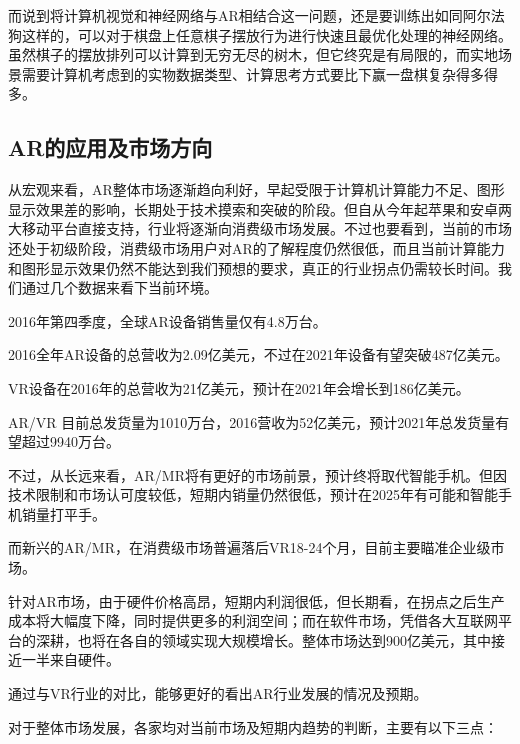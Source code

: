 \documentclass{article}
\begin{document}
而说到将计算机视觉和神经网络与AR相结合这一问题，还是要训练出如同阿尔法狗这样的，可以对于棋盘上任意棋子摆放行为进行快速且最优化处理的神经网络。虽然棋子的摆放排列可以计算到无穷无尽的树木，但它终究是有局限的，而实地场景需要计算机考虑到的实物数据类型、计算思考方式要比下赢一盘棋复杂得多得多。\par
\subsection{AR的应用及市场方向}
从宏观来看，AR整体市场逐渐趋向利好，早起受限于计算机计算能力不足、图形显示效果差的影响，长期处于技术摸索和突破的阶段。但自从今年起苹果和安卓两大移动平台直接支持，行业将逐渐向消费级市场发展。不过也要看到，当前的市场还处于初级阶段，消费级市场用户对AR的了解程度仍然很低，而且当前计算能力和图形显示效果仍然不能达到我们预想的要求，真正的行业拐点仍需较长时间。我们通过几个数据来看下当前环境。\par
2016年第四季度，全球AR设备销售量仅有4.8万台。\par

2016全年AR设备的总营收为2.09亿美元，不过在2021年设备有望突破487亿美元。\par

VR设备在2016年的总营收为21亿美元，预计在2021年会增长到186亿美元。\par

AR/VR 目前总发货量为1010万台，2016营收为52亿美元，预计2021年总发货量有望超过9940万台。\par
不过，从长远来看，AR/MR将有更好的市场前景，预计终将取代智能手机。但因技术限制和市场认可度较低，短期内销量仍然很低，预计在2025年有可能和智能手机销量打平手。\par

而新兴的AR/MR，在消费级市场普遍落后VR18-24个月，目前主要瞄准企业级市场。\par
针对AR市场，由于硬件价格高昂，短期内利润很低，但长期看，在拐点之后生产成本将大幅度下降，同时提供更多的利润空间；而在软件市场，凭借各大互联网平台的深耕，也将在各自的领域实现大规模增长。整体市场达到900亿美元，其中接近一半来自硬件。\par
通过与VR行业的对比，能够更好的看出AR行业发展的情况及预期。\par

对于整体市场发展，各家均对当前市场及短期内趋势的判断，主要有以下三点：\par
\end{document}
